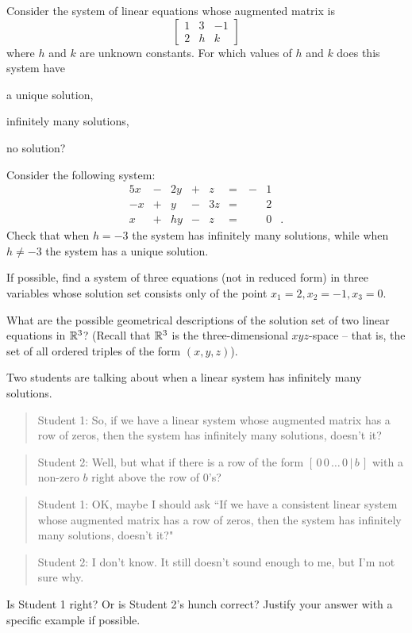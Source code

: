 
\be
\item Consider the system of linear equations whose augmented matrix is
\[ \left[ \begin{array}{cc|r} 1 & 3 & -1 \\ 2& h & k \end{array} \right] \]
where $h$ and $k$ are unknown constants. For which values of $h$ and $k$ does this system have 
	\ba
	\item a unique solution, 
	\item infinitely many solutions, 
	\item no solution? 
	\ea

\item Consider the following system:
\begin{alignat*}{5}
{}x 	&{}-{}	&{2}y	&{}+{}	&{}z		&{}={}	&\ {-}&1&{}\\
{-}x	&{}+{}	&{}y		&{}-{}	&{3}z	&{}={} &\ {}&2&{} \\
{}x	&{}+{}	&{h}y	&{}-{}	&{}z		&{}={}	& \ {}&0&{.}
\end{alignat*}
Check that when $h=-3$ the system has infinitely many solutions, while when $h\neq -3$ the system has a unique solution.


\item If possible, find a system of three equations (not in reduced form) in three variables whose solution set consists only of the point $x_1=2, x_2=-1, x_3=0$.

\item What are the possible geometrical descriptions of the solution set of two linear equations in $\mathbb{R}^3$? (Recall that $\mathbb{R}^3$ is the three-dimensional $xyz$-space -- that is, the set of all ordered triples of the form $(x,y,z)$).

\item Two students are talking about when a linear system has infinitely many solutions. 
\begin{quote}
Student 1: So, if we have a linear system whose augmented matrix has a row of zeros, then the system has infinitely many solutions, doesn't it?
\end{quote} 
\begin{quote}
Student 2: Well, but what if there is a row of the form $[\, 0\, 0\, \ldots\, 0\, |\, b\, ]$ with a non-zero $b$ right above the row of 0's?
\end{quote} 
\begin{quote}
Student 1: OK, maybe I should ask ``If we have a consistent linear system whose augmented matrix has a row of zeros, then the system has infinitely many solutions, doesn't it?"
\end{quote} 
\begin{quote}
Student 2: I don't know. It still doesn't sound enough to me, but I'm not sure why.
\end{quote}
Is Student 1 right? Or is Student 2's hunch correct? Justify your answer with a specific example if possible.


